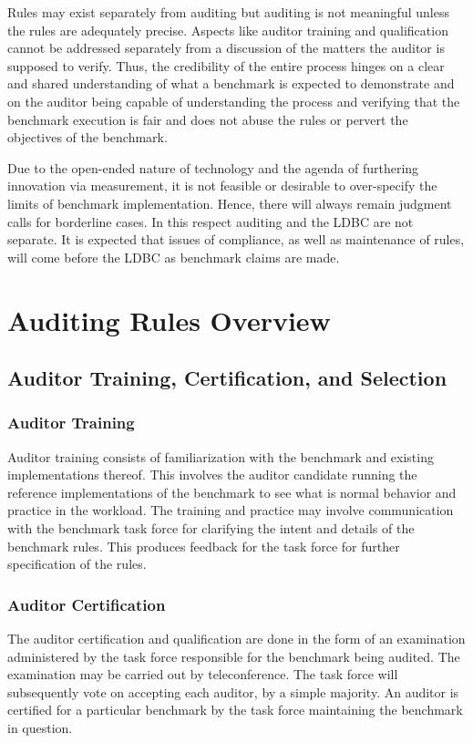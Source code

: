 Rules may exist separately from auditing but auditing is not meaningful unless the rules are adequately precise.
Aspects like auditor training and qualification cannot be addressed separately from a discussion of the matters the
auditor is supposed to verify. Thus, the credibility of the entire process hinges on a clear and shared understanding
of what a benchmark is expected to demonstrate and on the auditor being capable of understanding the process
and verifying that the benchmark execution is fair and does not abuse the rules or pervert the objectives of
the benchmark.

Due to the open-ended nature of technology and the agenda of furthering innovation via measurement, it is
not feasible or desirable to over-specify the limits of benchmark implementation. Hence, there will always remain
judgment calls for borderline cases. In this respect auditing and the LDBC are not separate. It is expected that
issues of compliance, as well as maintenance of rules, will come before the LDBC as benchmark claims are
made.


\section{Auditing Rules Overview}

\subsection{Auditor Training, Certification, and Selection}
\subsubsection{Auditor Training}
Auditor training consists of familiarization with the benchmark and existing implementations thereof. This involves the auditor candidate running the reference implementations of the benchmark to see what is normal behavior and practice in the workload. The training and practice may involve communication with the benchmark task force for clarifying the intent and details of the benchmark rules. This produces feedback for the task force for further specification of the rules.

\subsubsection{Auditor Certification}
The auditor certification and qualification are done in the form of an examination administered by the task force responsible for the benchmark being audited. The examination may be carried out by teleconference. The task force will subsequently vote on accepting each auditor, by a simple majority. An auditor is certified for a particular benchmark by the task force maintaining the benchmark in question.

